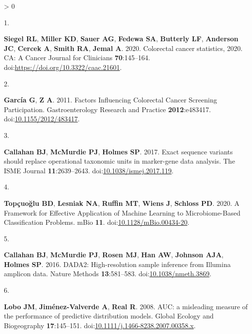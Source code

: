 \documentclass[
]{article}
\newlength{\cslhangindent}
\newlength{\csllabelwidth}
\newenvironment{CSLReferences}[2] %
 {%
  \setlength{\parindent}{0pt}
  \ifodd #1 \everypar{\setlength{\hangindent}{\cslhangindent}}\ignorespaces\fi
  \ifnum #2 > 0
  \setlength{\parskip}{#2\baselineskip}
  \fi
 }%
 {}
\newcommand{\CSLLeftMargin}[1]{\parbox[t]{\csllabelwidth}{#1}}
\newcommand{\CSLRightInline}[1]{\parbox[t]{\linewidth - \csllabelwidth}{#1}\break}
\begin{document}
\hypertarget{refs}{}
\begin{CSLReferences}{0}{1}
\leavevmode\hypertarget{ref-siegel2020}{}%
\CSLLeftMargin{1. }
\CSLRightInline{\textbf{Siegel RL}, \textbf{Miller KD}, \textbf{Sauer
AG}, \textbf{Fedewa SA}, \textbf{Butterly LF}, \textbf{Anderson JC},
\textbf{Cercek A}, \textbf{Smith RA}, \textbf{Jemal A}. 2020. Colorectal
cancer statistics, 2020. CA: A Cancer Journal for Clinicians
\textbf{70}:145--164. doi:\url{https://doi.org/10.3322/caac.21601}.}

\leavevmode\hypertarget{ref-garcuxeda2011a}{}%
\CSLLeftMargin{2. }
\CSLRightInline{\textbf{García G}, \textbf{Z A}. 2011. Factors
Influencing Colorectal Cancer Screening Participation. Gastroenterology
Research and Practice \textbf{2012}:e483417.
doi:\href{https://doi.org/10.1155/2012/483417}{10.1155/2012/483417}.}

\leavevmode\hypertarget{ref-callahan2017}{}%
\CSLLeftMargin{3. }
\CSLRightInline{\textbf{Callahan BJ}, \textbf{McMurdie PJ},
\textbf{Holmes SP}. 2017. Exact sequence variants should replace
operational taxonomic units in marker-gene data analysis. The ISME
Journal \textbf{11}:2639--2643.
doi:\href{https://doi.org/10.1038/ismej.2017.119}{10.1038/ismej.2017.119}.}

\leavevmode\hypertarget{ref-topuxe7uolu2020}{}%
\CSLLeftMargin{4. }
\CSLRightInline{\textbf{Topçuoğlu BD}, \textbf{Lesniak NA},
\textbf{Ruffin MT}, \textbf{Wiens J}, \textbf{Schloss PD}. 2020. A
Framework for Effective Application of Machine Learning to
Microbiome-Based Classification Problems. mBio \textbf{11}.
doi:\href{https://doi.org/10.1128/mBio.00434-20}{10.1128/mBio.00434-20}.}

\leavevmode\hypertarget{ref-callahan2016}{}%
\CSLLeftMargin{5. }
\CSLRightInline{\textbf{Callahan BJ}, \textbf{McMurdie PJ},
\textbf{Rosen MJ}, \textbf{Han AW}, \textbf{Johnson AJA}, \textbf{Holmes
SP}. 2016. DADA2: High-resolution sample inference from Illumina
amplicon data. Nature Methods \textbf{13}:581--583.
doi:\href{https://doi.org/10.1038/nmeth.3869}{10.1038/nmeth.3869}.}

\leavevmode\hypertarget{ref-lobo2008}{}%
\CSLLeftMargin{6. }
\CSLRightInline{\textbf{Lobo JM}, \textbf{Jiménez-Valverde A},
\textbf{Real R}. 2008. AUC: a misleading measure of the performance of
predictive distribution models. Global Ecology and Biogeography
\textbf{17}:145--151.
doi:\href{https://doi.org/10.1111/j.1466-8238.2007.00358.x}{10.1111/j.1466-8238.2007.00358.x}.}

\end{CSLReferences}
\end{document}
